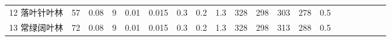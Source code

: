 \begin{landscape}
\begin{table}[htbp]
\begin{tabular}{@{}lccccccccccccccccccc@{}}
    12 落叶针叶林       & 57                                                                & 0.08                                                                                                   & 9                                                                                  & 0.01                                                                               & 0.015                                                               & 0.3                                                       & 0.2                                                       & 1.3                                                       & 328                                                             & 298                                                             & 303                                                              & 278                                                               & 0.5                                                          \\ %
%
    13 常绿阔叶林   & 72                                                                & 0.08                                                                                                   & 9                                                                                  & 0.01                                                                               & 0.015                                                               & 0.3                                                       & 0.2                                                       & 1.3                                                       & 328                                                             & 298                                                             & 313                                                              & 288                                                               & 0.5                                                          \\

\end{tabular}
\end{table}
\end{landscape}
